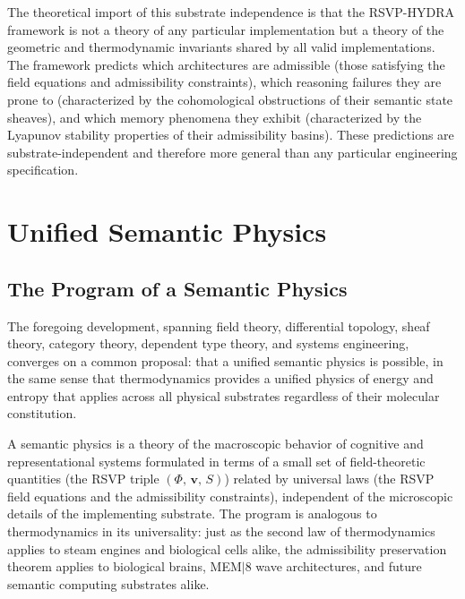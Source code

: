 \documentclass[12pt, a4paper, openany]{book}
\theoremstyle{plain}
\theoremstyle{definition}
\theoremstyle{remark}
\newcommand{\vvec}{\mathbf{v}}
\newcommand{\Sfield}{S}
\newcommand{\RSVPtriple}{(\Phi,\,\vvec,\,\Sfield)}
\begin{document}
The theoretical import of this substrate independence is that the RSVP-HYDRA framework is not a theory of any particular implementation but a theory of the geometric and thermodynamic invariants shared by all valid implementations. The framework predicts which architectures are admissible (those satisfying the field equations and admissibility constraints), which reasoning failures they are prone to (characterized by the cohomological obstructions of their semantic state sheaves), and which memory phenomena they exhibit (characterized by the Lyapunov stability properties of their admissibility basins). These predictions are substrate-independent and therefore more general than any particular engineering specification.

\chapter{Unified Semantic Physics}

\section{The Program of a Semantic Physics}

The foregoing development, spanning field theory, differential topology, sheaf theory, category theory, dependent type theory, and systems engineering, converges on a common proposal: that a unified semantic physics is possible, in the same sense that thermodynamics provides a unified physics of energy and entropy that applies across all physical substrates regardless of their molecular constitution.

A semantic physics is a theory of the macroscopic behavior of cognitive and representational systems formulated in terms of a small set of field-theoretic quantities (the RSVP triple $\RSVPtriple$) related by universal laws (the RSVP field equations and the admissibility constraints), independent of the microscopic details of the implementing substrate. The program is analogous to thermodynamics in its universality: just as the second law of thermodynamics applies to steam engines and biological cells alike, the admissibility preservation theorem applies to biological brains, MEM$|$8 wave architectures, and future semantic computing substrates alike.
\end{document}
